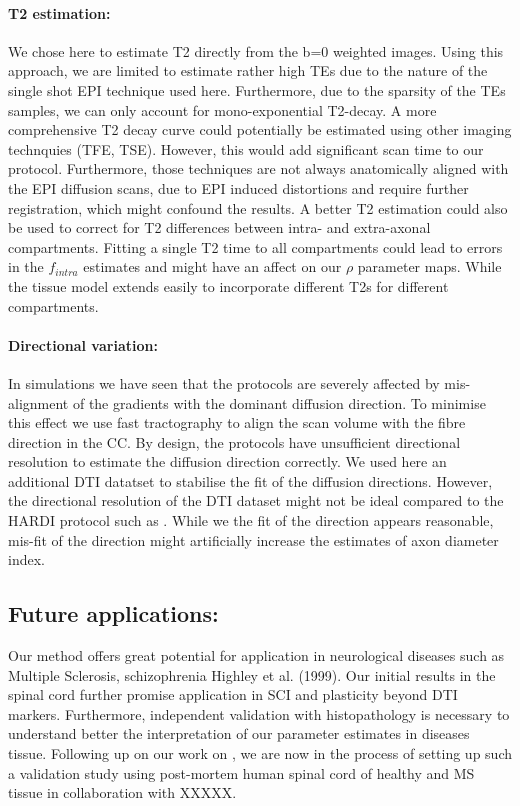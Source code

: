 \paragraph{T2 estimation: }
We chose here to estimate T2 directly from the b=0 weighted images. Using this approach, we are limited to estimate rather high \glspl{TE} due to the nature of the single shot EPI technique used here. Furthermore, due to the sparsity of the \glspl{TE} samples, we can only account for mono-exponential T2-decay. A more comprehensive T2 decay curve could potentially be estimated using other imaging technquies (TFE, TSE). However, this would add significant scan time to our protocol. Furthermore, those techniques are not always anatomically aligned with the EPI diffusion scans, due to EPI induced distortions and require further registration, which might confound the results. A better T2 estimation could also be used to correct for T2 differences between intra- and extra-axonal compartments. Fitting a single T2 time to all compartments could lead to errors in  the $f_{intra}$ estimates and might have an affect on our $\rho$ parameter maps. While the tissue model extends easily to incorporate different T2s for different compartments. 

\paragraph{Directional variation: } In simulations we have seen that the \SF{} protocols are severely affected by mis-alignment of the gradients with the dominant diffusion direction. To minimise this effect we use fast tractography to align the scan volume with the fibre direction in the CC. By design, the \SF{} protocols have unsufficient directional resolution to estimate the diffusion direction correctly. We used here an additional DTI datatset to stabilise the fit of the diffusion directions. However, the directional resolution of the DTI dataset might not be ideal compared to the HARDI protocol such as \OI. While we the fit of the direction appears reasonable, mis-fit of the direction might artificially increase the estimates of axon diameter index. 

\subsection*{Future applications: }
Our method offers great potential for application in neurological diseases such as Multiple Sclerosis, schizophrenia   Highley et al. (1999). Our initial results in the spinal cord further promise application in \gls{SCI} and plasticity beyond DTI markers. Furthermore, independent validation with histopathology is necessary to understand better the interpretation of our parameter estimates in diseases tissue. Following up on our work on \SFasym{}, we are now in the process of setting up such a validation study using post-mortem human spinal cord of healthy and MS tissue in collaboration with XXXXX.



